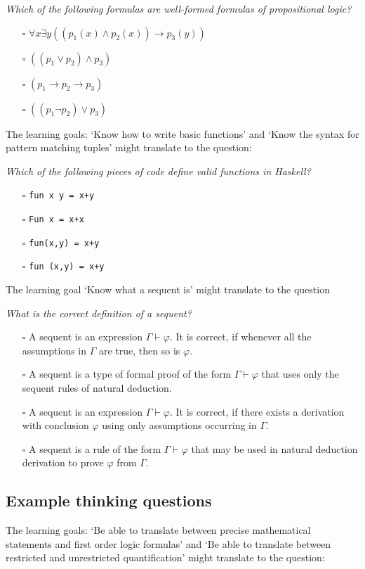 \documentclass{article}[12pt]
\begin{document}
\emph{Which of the following formulas are well-formed formulas of propositional logic?}
\begin{itemize}
    \item[$\square$] $\forall x \exists y ((p_1(x) \wedge p_2(x) ) \rightarrow p_3(y))$
    \item[$\square$] $ ((p_1 \vee p_2) \wedge p_3) $
    \item[$\square$] $ (p_1 \rightarrow p_2 \rightarrow p_3)$
    \item[$\square$] $ ((p_1 \neg p_2) \vee p_3 )$
\end{itemize}

The learning goals: `Know how to write basic functions' and `Know the syntax for pattern matching tuples' might translate to the question:

\emph{Which of the following pieces of code define valid functions in Haskell?}
\begin{itemize}
    \item[$\square$] \verb|fun x y = x+y|
    \item[$\square$] \verb|Fun x = x+x|
    \item[$\square$] \verb|fun(x,y) = x+y|
    \item[$\square$] \verb|fun (x,y) = x+y|
\end{itemize}

The learning goal `Know what a sequent is' might translate to the question

\emph{What is the correct definition of a sequent?}
\begin{itemize}
    \item[$\square$] A sequent is an expression $\Gamma \vdash \varphi$. It is correct, if whenever all the assumptions in $\Gamma$ are true, then so is $\varphi$.
    \item[$\square$]  A sequent is a type of formal proof of the form $\Gamma \vdash \varphi$ that uses only the sequent rules of natural deduction.
    \item[$\square$] A sequent is an expression $\Gamma \vdash \varphi$. It is correct, if there exists a derivation with conclusion $\varphi$ using only assumptions occurring in $\Gamma$.
    \item[$\square$]  A sequent is a rule of the form $\Gamma \vdash \varphi$ that may be used in natural deduction derivation to prove $\varphi$ from $\Gamma$.
\end{itemize}

\subsection{Example thinking questions}
The learning goals: `Be able to translate between precise mathematical statements and first order logic formulas' and `Be able to translate between restricted and unrestricted quantification' might translate to the question:
\end{document}
